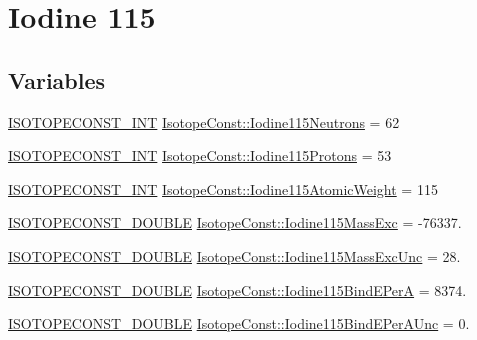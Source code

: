 \hypertarget{group___isotope_const-_iodine-_i115}{}\section{Iodine 115}
\label{group___isotope_const-_iodine-_i115}
\subsection*{Variables}
\begin{DoxyCompactItemize}
\item 
\mbox{\hyperlink{group___isotope_const-_macros_ga5f18360b3e99483a35c32d789e62621c}{I\+S\+O\+T\+O\+P\+E\+C\+O\+N\+S\+T\+\_\+\+I\+NT}} \mbox{\hyperlink{group___isotope_const-_iodine-_i115_ga85639bcde86e9257caf097fc38db210d}{Isotope\+Const\+::\+Iodine115\+Neutrons}} = 62
\item 
\mbox{\hyperlink{group___isotope_const-_macros_ga5f18360b3e99483a35c32d789e62621c}{I\+S\+O\+T\+O\+P\+E\+C\+O\+N\+S\+T\+\_\+\+I\+NT}} \mbox{\hyperlink{group___isotope_const-_iodine-_i115_gafd4dace4413850ae1b56c5b1f5c0ca50}{Isotope\+Const\+::\+Iodine115\+Protons}} = 53
\item 
\mbox{\hyperlink{group___isotope_const-_macros_ga5f18360b3e99483a35c32d789e62621c}{I\+S\+O\+T\+O\+P\+E\+C\+O\+N\+S\+T\+\_\+\+I\+NT}} \mbox{\hyperlink{group___isotope_const-_iodine-_i115_gae242095b05389858b4f5bcc13c2cc44f}{Isotope\+Const\+::\+Iodine115\+Atomic\+Weight}} = 115
\item 
\mbox{\hyperlink{group___isotope_const-_macros_ga8f45a7272ce02c0b4c65c44636ed719a}{I\+S\+O\+T\+O\+P\+E\+C\+O\+N\+S\+T\+\_\+\+D\+O\+U\+B\+LE}} \mbox{\hyperlink{group___isotope_const-_iodine-_i115_gacd7df83443ee619b1f2c56f99ddbc199}{Isotope\+Const\+::\+Iodine115\+Mass\+Exc}} = -\/76337.
\item 
\mbox{\hyperlink{group___isotope_const-_macros_ga8f45a7272ce02c0b4c65c44636ed719a}{I\+S\+O\+T\+O\+P\+E\+C\+O\+N\+S\+T\+\_\+\+D\+O\+U\+B\+LE}} \mbox{\hyperlink{group___isotope_const-_iodine-_i115_ga0d7252a1df686c14dbeed114c53cf7d5}{Isotope\+Const\+::\+Iodine115\+Mass\+Exc\+Unc}} = 28.
\item 
\mbox{\hyperlink{group___isotope_const-_macros_ga8f45a7272ce02c0b4c65c44636ed719a}{I\+S\+O\+T\+O\+P\+E\+C\+O\+N\+S\+T\+\_\+\+D\+O\+U\+B\+LE}} \mbox{\hyperlink{group___isotope_const-_iodine-_i115_ga861f111453dd9a0918219ba1f399f8aa}{Isotope\+Const\+::\+Iodine115\+Bind\+E\+PerA}} = 8374.
\item 
\mbox{\hyperlink{group___isotope_const-_macros_ga8f45a7272ce02c0b4c65c44636ed719a}{I\+S\+O\+T\+O\+P\+E\+C\+O\+N\+S\+T\+\_\+\+D\+O\+U\+B\+LE}} \mbox{\hyperlink{group___isotope_const-_iodine-_i115_gaecf5fff09df769b21d4c3f349a53b480}{Isotope\+Const\+::\+Iodine115\+Bind\+E\+Per\+A\+Unc}} = 0.

\end{DoxyCompactItemize}
